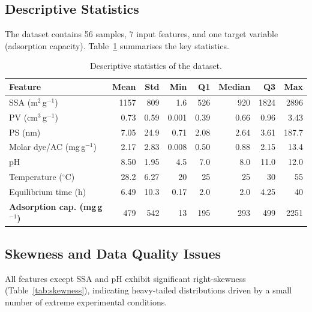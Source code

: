 \documentclass[12pt,a4paper]{article}
\begin{document}
\subsection{Descriptive Statistics}

The dataset contains 56 samples, 7 input features, and one target variable
(adsorption capacity).  Table~\ref{tab:descriptive} summarises the key
statistics.

\begin{table}[h]
\centering
\caption{Descriptive statistics of the dataset.}
\label{tab:descriptive}
\small
\begin{tabular}{lrrrrrrr}
\toprule
Feature & Mean & Std & Min & Q1 & Median & Q3 & Max \\
\midrule
SSA (m$^2$\,g$^{-1}$)      & 1157  & 809  & 1.6   & 526  & 920  & 1824 & 2896 \\
PV (cm$^3$\,g$^{-1}$)       & 0.73  & 0.59 & 0.001 & 0.39 & 0.66 & 0.96 & 3.43 \\
PS (nm)                      & 7.05  & 24.9 & 0.71  & 2.08 & 2.64 & 3.61 & 187.7 \\
Molar dye/AC (mg\,g$^{-1}$) & 2.17  & 2.83 & 0.008 & 0.50 & 0.88 & 2.15 & 13.4 \\
pH                           & 8.50  & 1.95 & 4.5   & 7.0  & 8.0  & 11.0 & 12.0 \\
Temperature ($^\circ$C)      & 28.2  & 6.27 & 20    & 25   & 25   & 30   & 55 \\
Equilibrium time (h)         & 6.49  & 10.3 & 0.17  & 2.0  & 2.0  & 4.25 & 40 \\
\midrule
\textbf{Adsorption cap. (mg\,g$^{-1}$)} & 479 & 542 & 13 & 195 & 293 & 499 & 2251 \\
\bottomrule
\end{tabular}
\end{table}

\subsection{Skewness and Data Quality Issues}

All features except SSA and pH exhibit significant right-skewness
(Table~\ref{tab:skewness}), indicating heavy-tailed distributions driven
by a small number of extreme experimental conditions.
\end{document}

